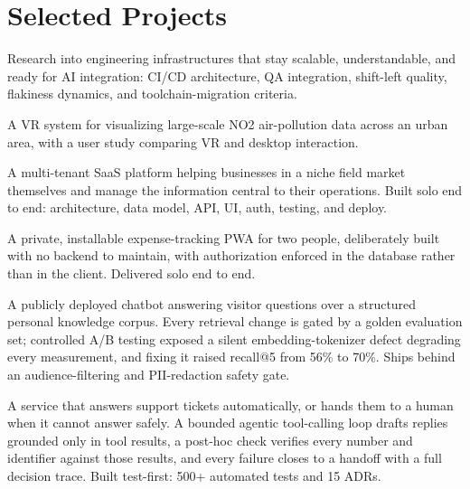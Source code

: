 \documentclass[10pt,a4paper]{article}
\newcommand{\cvproject}[3]{\needspace{4\baselineskip}\vspace{2pt}{\bfseries #1}\par\vspace{-4pt}{\itshape\small Tech stack: #2\par}\vspace{-4pt}#3\par}
\begin{document}
\section{Selected Projects}

\cvproject{Lean-Driven QA \& CI/CD Re-Engineering Towards AI-Ready Infrastructures (Master's Thesis)}{CI/CD architecture · QA architecture · Test-suite optimization · Research}{Research into engineering infrastructures that stay scalable, understandable, and ready for AI integration: CI/CD architecture, QA integration, shift-left quality, flakiness dynamics, and toolchain-migration criteria.}

\cvproject{Big Data Analysis \& Representation: NO2 Air Pollution in VR (Bachelor's Final Project)}{OpenXR · VTK · Unity · 3D}{A VR system for visualizing large-scale NO2 air-pollution data across an urban area, with a user study comparing VR and desktop interaction.}

\cvproject{Niche-Field SaaS Marketing \& Admin Platform}{TypeScript · React · Express · PostgreSQL · Drizzle · Zod · Playwright · Vercel}{A multi-tenant SaaS platform helping businesses in a niche field market themselves and manage the information central to their operations. Built solo end to end: architecture, data model, API, UI, auth, testing, and deploy.}

\cvproject{Shared Expense Tracker (Serverless PWA)}{TypeScript · React · Supabase · PostgreSQL (RLS) · Google OAuth · Workbox}{A private, installable expense-tracking PWA for two people, deliberately built with no backend to maintain, with authorization enforced in the database rather than in the client. Delivered solo end to end.}

\cvproject{Production RAG Chatbot}{Python · LangChain · ChromaDB · Ollama · Docker Compose · Cloudflare Tunnel}{A publicly deployed chatbot answering visitor questions over a structured personal knowledge corpus. Every retrieval change is gated by a golden evaluation set; controlled A/B testing exposed a silent embedding-tokenizer defect degrading every measurement, and fixing it raised recall@5 from 56\% to 70\%. Ships behind an audience-filtering and PII-redaction safety gate.}

\cvproject{Support Ticket Auto-Reply: Guardrailed Agentic Pipeline}{Python · FastAPI · Pydantic · SQLite · pytest · Docker Compose · Ollama}{A service that answers support tickets automatically, or hands them to a human when it cannot answer safely. A bounded agentic tool-calling loop drafts replies grounded only in tool results, a post-hoc check verifies every number and identifier against those results, and every failure closes to a handoff with a full decision trace. Built test-first: 500+ automated tests and 15 ADRs.}
\end{document}

